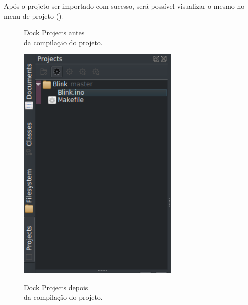 Após o projeto ser importado com sucesso, será possível visualizar o mesmo no menu de projeto ().

\begin{figure}[!htb]
  \begin{minipage}[t]{0.5\textwidth}
  \caption[Projects antes da compilação]{Dock Projects antes\\ da compilação do projeto.}
  \label{fig:projects}
  \includegraphics[width=0.7\textwidth]{figuras/projects.png}
  \end{minipage}%
  \begin{minipage}[t]{0.5\textwidth}
  \caption[Projects depois da compilação]{Dock Projects depois\\ da compilação do projeto.}

\end{minipage}
\end{figure}
